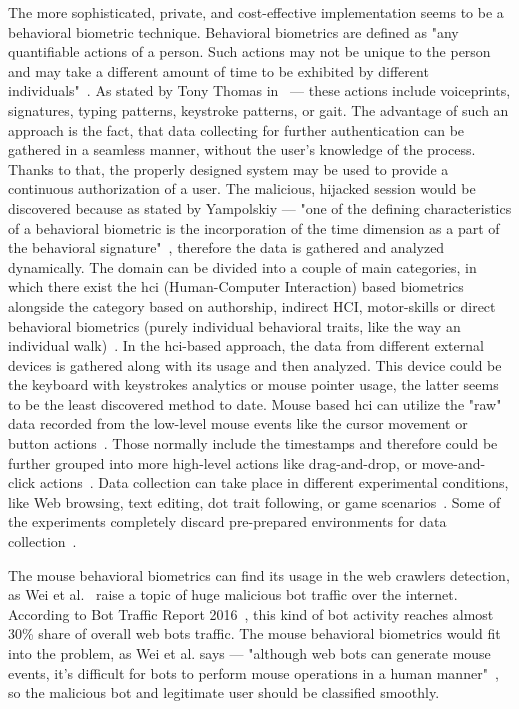 The more sophisticated, private, and cost-effective implementation seems to be a behavioral biometric technique.
Behavioral biometrics are defined as "any quantifiable actions of a person.
Such actions may not be unique to the person and may take a different amount of time to be exhibited by different individuals"~\cite{Yampolskiy2011}.
As stated by Tony Thomas in~\cite{thomas2020machine} --- these actions include voiceprints, signatures, typing patterns, keystroke patterns, or gait.
The advantage of such an approach is the fact, that data collecting for further authentication can be gathered in a seamless manner, without the user's knowledge of the process.
Thanks to that, the properly designed system may be used to provide a continuous authorization of a user.
The malicious, hijacked session would be discovered because as stated by Yampolskiy --- "one of the defining characteristics of a behavioral biometric is the incorporation of the time dimension as a part of the behavioral signature"~\cite{Yampolskiy2011}, therefore the data is gathered and analyzed dynamically.
The domain can be divided into a couple of main categories, in which there exist the \gls{hci} (Human-Computer Interaction) based biometrics alongside the category based on authorship, indirect HCI, motor-skills or direct behavioral biometrics (purely individual behavioral traits, like the way an individual walk)~\cite{Yampolskiy2011}.
In the \gls{hci}-based approach, the data from different external devices is gathered along with its usage and then analyzed.
This device could be the keyboard with keystrokes analytics or mouse pointer usage, the latter seems to be the least discovered method to date.
Mouse based \gls{hci} can utilize the "raw" data recorded from the low-level mouse events like the cursor movement or button actions~\cite{kasprowski2018fusion}.
Those normally include the timestamps and therefore could be further grouped into more high-level actions like drag-and-drop, or move-and-click actions~\cite{kasprowski2018fusion}.
Data collection can take place in different experimental conditions, like Web browsing, text editing, dot trait following, or game scenarios~\cite{kasprowski2018fusion}.
Some of the experiments completely discard pre-prepared environments for data collection~\cite{kasprowski2018fusion}.

The mouse behavioral biometrics can find its usage in the web crawlers detection, as Wei et al.~\cite{a-deep-learning-approach-to-web-bot-detection-using-mouse-behavioral-biometrics} raise a topic of huge malicious bot traffic over the internet.
According to Bot Traffic Report 2016~\cite{bot-share-2016}, this kind of bot activity reaches almost 30\% share of overall web bots traffic.
The mouse behavioral biometrics would fit into the problem, as Wei et al. says --- "although web bots can generate mouse events, it’s difficult for bots to perform mouse operations in a human manner"~\cite{a-deep-learning-approach-to-web-bot-detection-using-mouse-behavioral-biometrics}, so the malicious bot and legitimate user should be classified smoothly.